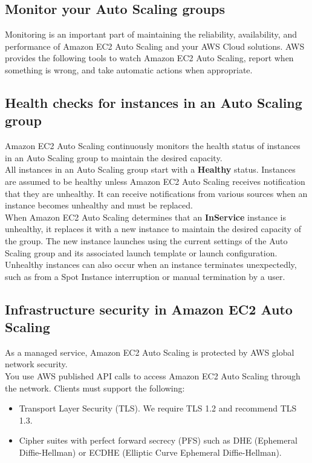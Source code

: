 \documentclass[12pt, letterpaper, twoside]{article}
\begin{document}
\subsection{Monitor your Auto Scaling groups}
Monitoring is an important part of maintaining the reliability, availability, and performance of Amazon EC2 Auto Scaling and your 
AWS Cloud solutions. AWS provides the following tools to watch Amazon EC2 Auto Scaling, report when something is wrong, 
and take automatic actions when appropriate.

\subsection{Health checks for instances in an Auto Scaling group}
Amazon EC2 Auto Scaling continuously monitors the health status of instances in an Auto Scaling group to maintain the desired capacity.\\

All instances in an Auto Scaling group start with a \textbf{Healthy} status. Instances are assumed to be healthy unless Amazon EC2 Auto Scaling
receives notification that they are unhealthy. It can receive notifications from various sources when an instance becomes unhealthy 
and must be replaced.\\

When Amazon EC2 Auto Scaling determines that an \textbf{InService} instance is unhealthy, it replaces it with a new instance to maintain the 
desired capacity of the group. The new instance launches using the current settings of the Auto Scaling group and its associated launch 
template or launch configuration.\\

Unhealthy instances can also occur when an instance terminates unexpectedly, such as from a Spot Instance interruption or manual 
termination by a user.\\

\subsection{Infrastructure security in Amazon EC2 Auto Scaling}
As a managed service, Amazon EC2 Auto Scaling is protected by AWS global network security.\\
You use AWS published API calls to access Amazon EC2 Auto Scaling through the network. Clients must support the following:

\begin{itemize}
	\item Transport Layer Security (TLS). We require TLS 1.2 and recommend TLS 1.3.
	\item Cipher suites with perfect forward secrecy (PFS) such as DHE (Ephemeral Diffie-Hellman) or ECDHE (Elliptic Curve Ephemeral 
		Diffie-Hellman).
\end{itemize}
\end{document}
